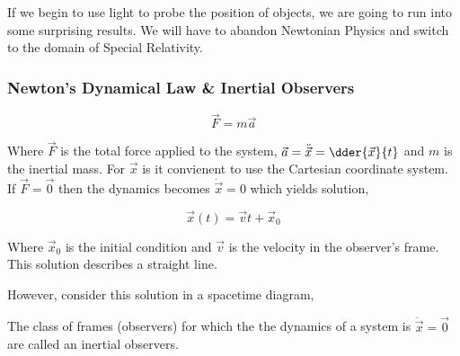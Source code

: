 \documentclass{article}
\begin{document}
If we begin to use light to probe the position of objects, we are going to run into some surprising results. We will have to abandon Newtonian Physics and switch to the domain of Special Relativity.

\subsubsection{Newton's Dynamical Law \& Inertial Observers}

\[ \vec{F} = m \vec{a}\]

Where $\vec{F}$ is the total force applied to the system, $\vec{a} = \ddot{\vec{x}} = \dder{\vec{x}}{t}$ and $m$ is the inertial mass. For $\vec{x}$ is it convienent to use the Cartesian coordinate system. \\

If $\vec{F} = \vec{0}$ then the dynamics becomes $\ddot{\vec{x}} = 0$ which yields solution,

\[ \vec{x}(t) = \vec{v} t + \vec{x}_0 \]

Where $\vec{x}_0$ is the initial condition and $\vec{v}$ is the velocity in the observer's frame. This solution describes a straight line.

\begin{center}
\end{center}

However, consider this solution in a spacetime diagram,

\begin{center}
\end{center}


The class of frames (observers) for which the the dynamics of a system is $\ddot{\vec{x}} = \vec{0}$ are called an inertial observers.
\end{document}

